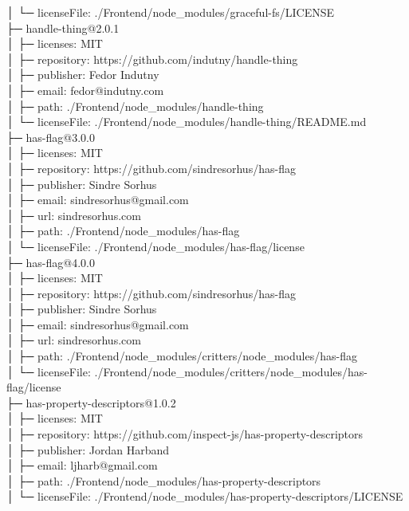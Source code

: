 │  └─ licenseFile: ./Frontend/node\_modules/graceful-fs/LICENSE\\
├─ handle-thing@2.0.1\\
│  ├─ licenses: MIT\\
│  ├─ repository: https://github.com/indutny/handle-thing\\
│  ├─ publisher: Fedor Indutny\\
│  ├─ email: fedor@indutny.com\\
│  ├─ path: ./Frontend/node\_modules/handle-thing\\
│  └─ licenseFile: ./Frontend/node\_modules/handle-thing/README.md\\
├─ has-flag@3.0.0\\
│  ├─ licenses: MIT\\
│  ├─ repository: https://github.com/sindresorhus/has-flag\\
│  ├─ publisher: Sindre Sorhus\\
│  ├─ email: sindresorhus@gmail.com\\
│  ├─ url: sindresorhus.com\\
│  ├─ path: ./Frontend/node\_modules/has-flag\\
│  └─ licenseFile: ./Frontend/node\_modules/has-flag/license\\
├─ has-flag@4.0.0\\
│  ├─ licenses: MIT\\
│  ├─ repository: https://github.com/sindresorhus/has-flag\\
│  ├─ publisher: Sindre Sorhus\\
│  ├─ email: sindresorhus@gmail.com\\
│  ├─ url: sindresorhus.com\\
│  ├─ path: ./Frontend/node\_modules/critters/node\_modules/has-flag\\
│  └─ licenseFile: ./Frontend/node\_modules/critters/node\_modules/has-flag/license\\
├─ has-property-descriptors@1.0.2\\
│  ├─ licenses: MIT\\
│  ├─ repository: https://github.com/inspect-js/has-property-descriptors\\
│  ├─ publisher: Jordan Harband\\
│  ├─ email: ljharb@gmail.com\\
│  ├─ path: ./Frontend/node\_modules/has-property-descriptors\\
│  └─ licenseFile: ./Frontend/node\_modules/has-property-descriptors/LICENSE\\
